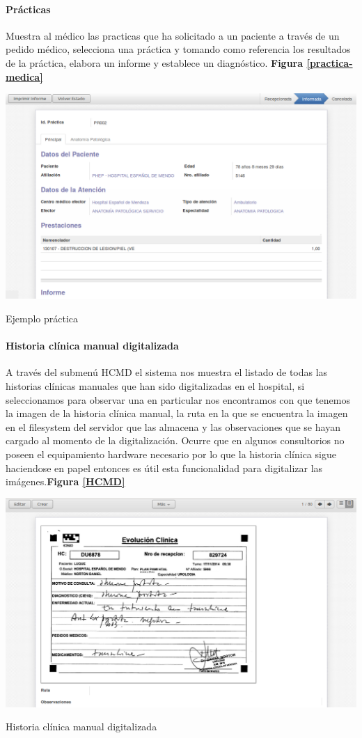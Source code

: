 \paragraph{Prácticas}

Muestra al médico las practicas que ha solicitado a un paciente a través de un pedido médico, selecciona una práctica y tomando como referencia los resultados de la práctica, elabora un informe y establece un diagnóstico.
\textbf{Figura \ref{practica-medica}}

\begin{correccionFigure}
      \centering
      \includegraphics[width=.8\textwidth]{img/tp1/HE/Practica1}
      \caption{Ejemplo práctica}
      \label{practica-medica}
\end{correccionFigure}


\paragraph{Historia clínica manual digitalizada}

A través del submenú HCMD el sistema nos muestra el listado de todas las historias clínicas manuales que han sido digitalizadas en el hospital, si seleccionamos para observar una en particular nos encontramos con que tenemos la imagen de la historia clínica manual, la ruta en la que se encuentra la imagen en el filesystem del servidor que las almacena y las observaciones que se hayan cargado al momento de la digitalización.
Ocurre que en algunos consultorios no poseen el equipamiento hardware necesario por lo que la historia clínica sigue haciendose en papel entonces es útil esta funcionalidad para digitalizar las imágenes.\textbf{Figura \ref{HCMD}}

\begin{correccionFigure}[ht]
      \centering
      \includegraphics[width=.8\textwidth]{img/tp1/HE/HCMDmanualdigital}
      \caption{Historia clínica manual digitalizada}
      \label{HCMD}
\end{correccionFigure}


